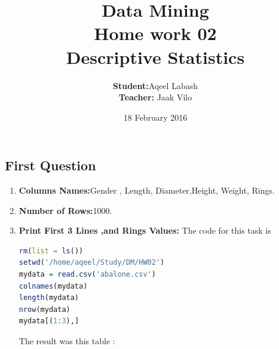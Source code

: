\documentclass{article}
\title{Data Mining\\
		Home work 02\\ Descriptive Statistics}
\author{\textbf{Student:}Aqeel Labash\\ \textbf{Teacher:} Jaak Vilo}
\date{18 February 2016}
\begin{document}
	\maketitle

\begin{multicols*}{2}
{	\centering	\section*{First Question}}
	\begin{enumerate}[label=\Alph*)]
		\item \textbf{Columns Names:}Gender , Length, Diameter,Height, Weight, Rings.
		\item \textbf{Number of Rows:}1000.
		\item \textbf{Print First 3 Lines ,and Rings Values:} The code for this task is 
		\begin{lstlisting}[language=R]
rm(list = ls())
setwd('/home/aqeel/Study/DM/HW02')
mydata = read.csv('abalone.csv')
colnames(mydata)
length(mydata)
nrow(mydata)
mydata[(1:3),]
		\end{lstlisting}
		The result was this table :
		

\end{enumerate}
\end{multicols*}
\end{document}
